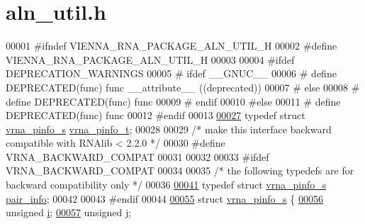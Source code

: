 \hypertarget{aln__util_8h_source}{}\section{aln\+\_\+util.\+h}
\label{aln__util_8h_source}

\begin{DoxyCode}
00001 \textcolor{preprocessor}{#ifndef VIENNA\_RNA\_PACKAGE\_ALN\_UTIL\_H}
00002 \textcolor{preprocessor}{#define VIENNA\_RNA\_PACKAGE\_ALN\_UTIL\_H}
00003 
00004 \textcolor{preprocessor}{#ifdef DEPRECATION\_WARNINGS}
00005 \textcolor{preprocessor}{# ifdef \_\_GNUC\_\_}
00006 \textcolor{preprocessor}{#  define DEPRECATED(func) func \_\_attribute\_\_ ((deprecated))}
00007 \textcolor{preprocessor}{# else}
00008 \textcolor{preprocessor}{#  define DEPRECATED(func) func}
00009 \textcolor{preprocessor}{# endif}
00010 \textcolor{preprocessor}{#else}
00011 \textcolor{preprocessor}{# define DEPRECATED(func) func}
00012 \textcolor{preprocessor}{#endif}
00013 
\hypertarget{aln__util_8h_source.tex_l00027}{}\hyperlink{group__aln__utils_ga6660dfca23debee7306e0cd53341263f}{00027} \textcolor{keyword}{typedef} \textcolor{keyword}{struct }\hyperlink{structvrna__pinfo__s}{vrna\_pinfo\_s}     \hyperlink{structvrna__pinfo__s}{vrna\_pinfo\_t};
00028 
00029 \textcolor{comment}{/* make this interface backward compatible with RNAlib < 2.2.0 */}
00030 \textcolor{preprocessor}{#define VRNA\_BACKWARD\_COMPAT}
00031 
00032 
00033 \textcolor{preprocessor}{#ifdef VRNA\_BACKWARD\_COMPAT}
00034 
00035 \textcolor{comment}{/* the following typedefs are for backward compatibility only */}
00036 
\hypertarget{aln__util_8h_source.tex_l00041}{}\hyperlink{aln__util_8h_a7b61662a793ad0aa1ea38efc3a5baacc}{00041} \textcolor{keyword}{typedef} \textcolor{keyword}{struct }\hyperlink{structvrna__pinfo__s}{vrna\_pinfo\_s}     \hyperlink{structvrna__pinfo__s}{pair\_info};
00042 
00043 \textcolor{preprocessor}{#endif}
00044 
\hypertarget{aln__util_8h_source.tex_l00055}{}\hyperlink{structvrna__pinfo__s}{00055} \textcolor{keyword}{struct }\hyperlink{structvrna__pinfo__s}{vrna\_pinfo\_s} \{
\hypertarget{aln__util_8h_source.tex_l00056}{}\hyperlink{structvrna__pinfo__s_ab91db0a87ef8402dc151795ba5a64c6f}{00056}    \textcolor{keywordtype}{unsigned} \hyperlink{structvrna__pinfo__s_ab91db0a87ef8402dc151795ba5a64c6f}{i};    
\hypertarget{aln__util_8h_source.tex_l00057}{}\hyperlink{structvrna__pinfo__s_a4142e38d6ba127acccdf680300a88e1f}{00057}    \textcolor{keywordtype}{unsigned} \hyperlink{structvrna__pinfo__s_a4142e38d6ba127acccdf680300a88e1f}{j};    

\end{DoxyCode}
